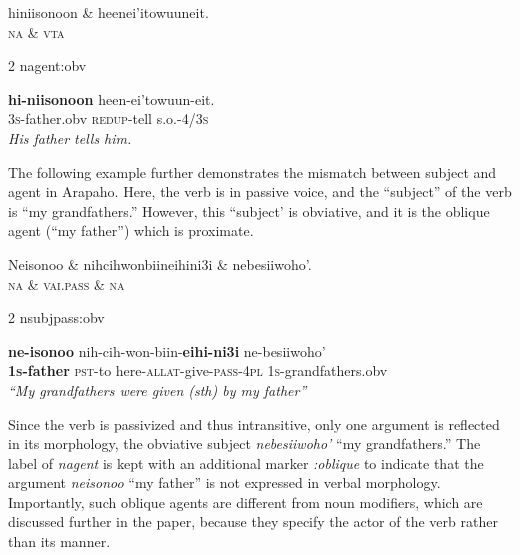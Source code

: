 \documentclass[11pt]{article}
\begin{document}
\small
\begin{exe}
\ex \label{agent:obv}%
\begin{dependency}
\begin{deptext}
hiniisonoon \& heenei'itowuuneit.\\
\textsc{na} \& \textsc{vta}\\
\end{deptext}
	{2}	{nagent:obv}
\end{dependency}
\gll \textbf{hi-niisonoon} {heen-ei'towuun-eit}.\\
\textsc{3s}-father.obv {\textsc{redup}-tell s.o.-\textsc{4/3s}}\\
\trans \textit{His father tells him.}
\end{exe}
\normalsize
The following example further demonstrates the mismatch between subject and agent in Arapaho. Here, the verb is in passive voice, and the ``subject'' of the verb is ``my grandfathers.'' However, this ``subject' is obviative, and it is the oblique agent (``my father'') which is proximate.
 
 \small
\begin{exe}
\ex \label{middle}
\begin{dependency}
\begin{deptext}
Neisonoo \& nihcihwonbiineihini3i \& nebesiiwoho'.\\
\textsc{na} \& \textsc{vai.pass}	\& \textsc{na}\\
\end{deptext}
	{2}	{nsubjpass:obv}
\end{dependency}
\gll \textbf{ne-isonoo} {nih-cih-won-biin-\textbf{eihi-ni3i}} {ne-besiiwoho'} \\
\textbf{\textsc{1s}-father} {\textsc{pst}-to here-\textsc{allat}-give-\textsc{pass}-\textsc{4pl}} \textsc{1s}-grandfathers.obv\\
\trans \textit{``My grandfathers were given (sth) by my father''}
\end{exe}
\normalsize
Since the verb is passivized and thus intransitive, only one argument is reflected in its morphology, the obviative subject \textit{nebesiiwoho'} ``my grandfathers.'' The label of \textit{nagent} is kept with an additional marker \textit{:oblique} to indicate that the argument \textit{neisonoo} ``my father'' is not expressed in verbal morphology. Importantly, such oblique agents are different from noun modifiers, which are discussed further in the paper, because they specify the actor of the verb rather than its manner. 
\end{document}

